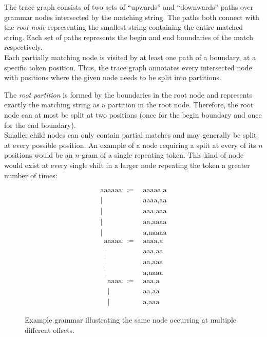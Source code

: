 \noindent
The trace graph consists of two sets of ``upwards'' and ``downwards'' paths over grammar nodes intersected by the matching string. The paths both connect with the \textit{root node} representing the smallest string containing the entire matched string.
Each set of paths represents the begin and end boundaries of the match respectively.\\
Each partially matching node is visited by at least one path of a boundary, at a specific token position. Thus, the trace graph annotates every intersected node with positions where the given node needs to be split into partitions.\par
\noindent
The \emph{root partition} is formed by the boundaries in the root node and represents exactly the matching string as a partition in the root node. Therefore, the root node can at most be split at two positions (once for the begin boundary and once for the end boundary).\\
Smaller child nodes can only contain partial matches and may generally be split at every possible position. An example of a node requiring a split at every of its $n$ positions would be an $n$-gram of a single repeating token. This kind of node would exist at every single shift in a larger node repeating the token a greater number of times:

\begin{figure}[ht!]
    \ttfamily
    \begin{multicols}{3}
    \noindent
    \begin{align*}
        \text{aaaaaa} :\coloneqq &\ \text{aaaaa,a}\\
                |&\ \text{aaaa,aa}\\
                |&\ \text{aaa,aaa}\\
                |&\ \text{aa,aaaa}\\
                |&\ \text{a,aaaaa}
    \end{align*}
    \begin{align*}
        \text{aaaaa} :\coloneqq &\ \text{aaaa,a}\\
                |&\ \text{aaa,aa}\\
                |&\ \text{aa,aaa}\\
                |&\ \text{a,aaaa}
    \end{align*}
    \begin{align*}
        \text{aaaa} :\coloneqq &\ \text{aaa,a}\\
                |&\ \text{aa,aa}\\
                |&\ \text{a,aaa}
    \end{align*}
    \end{multicols}
    \caption{Example grammar illustrating the same node occurring at multiple different offsets.}
\end{figure}

